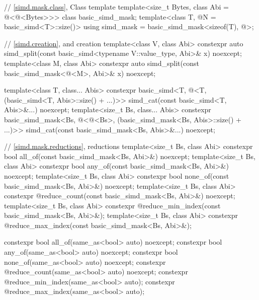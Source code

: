 \begin{codeblock}
{  // \ref{simd.mask.class}, Class template 
  template<size_t Bytes, class Abi = @\nativeabi@<@\integerfrom@<Bytes>>> class basic_simd_mask;
  template<class T, @\simdsizetype@ N = basic_simd<T>::size()>
    using simd_mask = basic_simd_mask<sizeof(T), @>;

  // \ref{simd.creation},  and  creation
  template<class V, class Abi>
    constexpr auto
      simd_split(const basic_simd<typename V::value_type, Abi>& x) noexcept;
  template<class M, class Abi>
    constexpr auto
      simd_split(const basic_simd_mask<@\maskelementsize@<M>, Abi>& x) noexcept;

  template<class T, class... Abis>
    constexpr basic_simd<T, @\deducet@<T, (basic_simd<T, Abis>::size() + ...)>>
      simd_cat(const basic_simd<T, Abis>&...) noexcept;
  template<size_t Bs, class... Abis>
    constexpr basic_simd_mask<Bs, @\deducet@<@\integerfrom@<Bs>,
                              (basic_simd_mask<Bs, Abis>::size() + ...)>>
      simd_cat(const basic_simd_mask<Bs, Abis>&...) noexcept;

  // \ref{simd.mask.reductions},  reductions
  template<size_t Bs, class Abi>
    constexpr bool all_of(const basic_simd_mask<Bs, Abi>&) noexcept;
  template<size_t Bs, class Abi>
    constexpr bool any_of(const basic_simd_mask<Bs, Abi>&) noexcept;
  template<size_t Bs, class Abi>
    constexpr bool none_of(const basic_simd_mask<Bs, Abi>&) noexcept;
  template<size_t Bs, class Abi>
    constexpr @\simdsizetype@ reduce_count(const basic_simd_mask<Bs, Abi>&) noexcept;
  template<size_t Bs, class Abi>
    constexpr @\simdsizetype@ reduce_min_index(const basic_simd_mask<Bs, Abi>&);
  template<size_t Bs, class Abi>
    constexpr @\simdsizetype@ reduce_max_index(const basic_simd_mask<Bs, Abi>&);

  constexpr bool all_of(same_as<bool> auto) noexcept;
  constexpr bool any_of(same_as<bool> auto) noexcept;
  constexpr bool none_of(same_as<bool> auto) noexcept;
  constexpr @\simdsizetype@ reduce_count(same_as<bool> auto) noexcept;
  constexpr @\simdsizetype@ reduce_min_index(same_as<bool> auto);
  constexpr @\simdsizetype@ reduce_max_index(same_as<bool> auto);

}
\end{codeblock}
